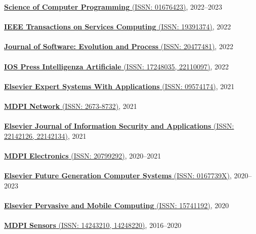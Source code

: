 \href{https://www.sciencedirect.com/journal/science-of-computer-programming}{\textbf{Science of Computer Programming} (ISSN: 01676423)}, 2022--2023
\\ \halfblankline \\
\href{https://www.computer.org/csdl/journal/sc}{\textbf{IEEE Transactions on Services Computing} (ISSN: 19391374)}, 2022
\\ \halfblankline \\
\href{https://onlinelibrary.wiley.com/journal/20477481}{\textbf{Journal of Software: Evolution and Process} (ISSN: 20477481)}, 2022
\\ \halfblankline \\
\href{https://www.iospress.com/catalog/journals/intelligenza-artificiale}{\textbf{IOS Press Intelligenza Artificiale} (ISSN: 17248035, 22110097)}, 2022
\\ \halfblankline \\
\href{https://www.journals.elsevier.com/expert-systems-with-applications}{\textbf{Elsevier Expert Systems With Applications} (ISSN: 09574174)}, 2021
\\ \halfblankline \\
\href{https://www.mdpi.com/journal/network}{\textbf{MDPI Network} (ISSN: 2673-8732)}, 2021
\\ \halfblankline \\
\href{https://www.journals.elsevier.com/journal-of-information-security-and-applications}{\textbf{Elsevier Journal of Information Security and Applications} (ISSN: 22142126, 22142134)}, 2021
\\ \halfblankline \\
\href{https://www.mdpi.com/journal/electronics}{\textbf{MDPI Electronics} (ISSN: 20799292)}, 2020--2021
\\ \halfblankline \\
\href{https://www.sciencedirect.com/journal/future-generation-computer-systems}{\textbf{Elsevier Future Generation Computer Systems} (ISSN: 0167739X)}, 2020--2023
\\ \halfblankline \\
\href{https://www.journals.elsevier.com/pervasive-and-mobile-computing}{\textbf{Elsevier Pervasive and Mobile Computing} (ISSN: 15741192)}, 2020
\\ \halfblankline \\
\href{http://www.mdpi.com/journal/sensors}{\textbf{MDPI Sensors} (ISSN: 14243210, 14248220)}, 2016--2020
\\ \halfblankline \\
